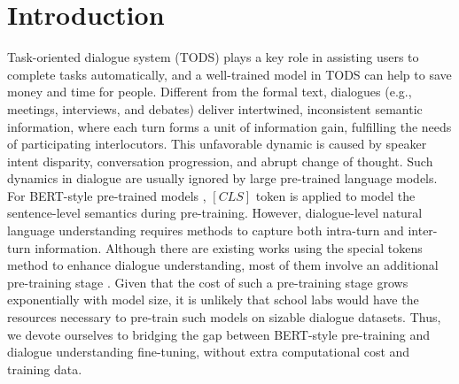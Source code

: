 
\section{Introduction}
\vspace{-0.15cm}
Task-oriented dialogue system (TODS) plays a key role in assisting users to complete tasks automatically, and a well-trained model in TODS can help to save money and time for people. Different from the formal text, dialogues (e.g., meetings, interviews, and debates) deliver intertwined, inconsistent semantic information, where each turn forms a unit of information gain, fulfilling the needs of participating interlocutors. This unfavorable dynamic is caused by speaker intent disparity, conversation progression, and abrupt change of thought. Such dynamics in dialogue are usually ignored by large pre-trained language models. For BERT-style pre-trained models \citep{bertbase}, $[CLS]$ token is applied to model the sentence-level semantics during pre-training. However, dialogue-level natural language understanding requires methods to capture both intra-turn and inter-turn information. Although there are existing works using the special tokens method to enhance dialogue understanding, most of them involve an additional pre-training stage \citep{DialogXL, DCM, chapuis2020hierarchical}. Given that the cost of such a pre-training stage grows exponentially with model size, it is unlikely that school labs would have the resources necessary to pre-train such models on sizable dialogue datasets. Thus, we devote ourselves to bridging the gap between BERT-style pre-training and dialogue understanding fine-tuning, without extra computational cost and training data. 

    

